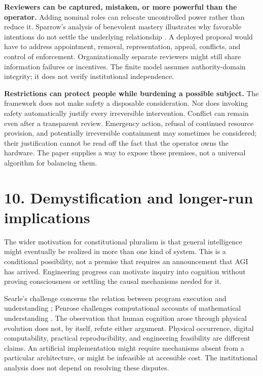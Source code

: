 \documentclass[11pt,a4paper]{article}
\begin{document}
\textbf{Reviewers can be captured, mistaken, or more powerful than the operator.} Adding nominal roles can relocate uncontrolled power rather than reduce it. Sparrow's analysis of benevolent mastery illustrates why favorable intentions do not settle the underlying relationship \cite{ref-7}. A deployed proposal would have to address appointment, removal, representation, appeal, conflicts, and control of enforcement. Organizationally separate reviewers might still share information failures or incentives. The finite model assumes authority-domain integrity; it does not verify institutional independence.

\textbf{Restrictions can protect people while burdening a possible subject.} The framework does not make safety a disposable consideration. Nor does invoking safety automatically justify every irreversible intervention. Conflict can remain even after a transparent review. Emergency action, refusal of continued resource provision, and potentially irreversible containment may sometimes be considered; their justification cannot be read off the fact that the operator owns the hardware. The paper supplies a way to expose these premises, not a universal algorithm for balancing them.

\hypertarget{section-11}{%
\section{10. Demystification and longer-run implications}\label{section-11}}

The wider motivation for constitutional pluralism is that general intelligence might eventually be realized in more than one kind of system. This is a conditional possibility, not a premise that requires an announcement that AGI has arrived. Engineering progress can motivate inquiry into cognition without proving consciousness or settling the causal mechanisms needed for it.

Searle's challenge concerns the relation between program execution and understanding \cite{ref-19}; Penrose challenges computational accounts of mathematical understanding \cite{ref-20}. The observation that human cognition arose through physical evolution does not, by itself, refute either argument. Physical occurrence, digital computability, practical reproducibility, and engineering feasibility are different claims. An artificial implementation might require mechanisms absent from a particular architecture, or might be infeasible at accessible cost. The institutional analysis does not depend on resolving these disputes.
\end{document}
